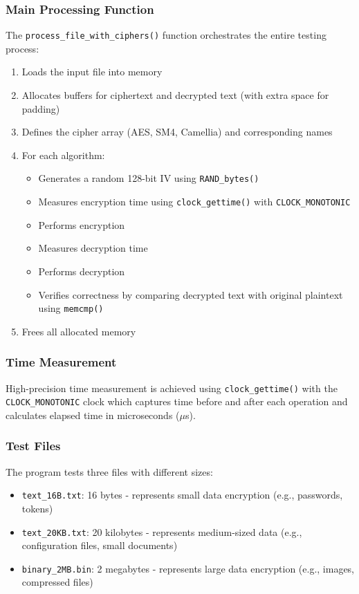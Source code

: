 \documentclass[12pt,a4paper]{article}
\begin{document}
\subsubsection{Main Processing Function}
The \texttt{process\_file\_with\_ciphers()} function orchestrates the entire testing process:
\begin{enumerate}
    \item Loads the input file into memory
    \item Allocates buffers for ciphertext and decrypted text (with extra space for padding)
    \item Defines the cipher array (AES, SM4, Camellia) and corresponding names
    \item For each algorithm:
    \begin{itemize}
        \item Generates a random 128-bit IV using \texttt{RAND\_bytes()}
        \item Measures encryption time using \texttt{clock\_gettime()} with \texttt{CLOCK\_MONOTONIC}
        \item Performs encryption
        \item Measures decryption time
        \item Performs decryption
        \item Verifies correctness by comparing decrypted text with original plaintext using \texttt{memcmp()}
    \end{itemize}
    \item Frees all allocated memory
\end{enumerate}

\subsubsection{Time Measurement}
High-precision time measurement is achieved using \texttt{clock\_gettime()} with the \texttt{CLOCK\_MONOTONIC} clock which captures time before and after each operation and calculates elapsed time in microseconds ($\mu$s).

\subsubsection{Test Files}
The program tests three files with different sizes:
\begin{itemize}
    \item \texttt{text\_16B.txt}: 16 bytes - represents small data encryption (e.g., passwords, tokens)
    \item \texttt{text\_20KB.txt}: 20 kilobytes - represents medium-sized data (e.g., configuration files, small documents)
    \item \texttt{binary\_2MB.bin}: 2 megabytes - represents large data encryption (e.g., images, compressed files)
\end{itemize}
\end{document}
